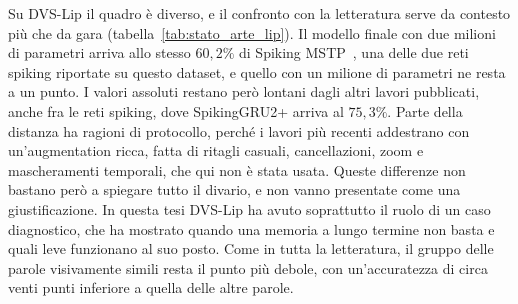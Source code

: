 Su DVS-Lip il quadro è diverso, e il confronto con la letteratura serve da contesto più che da gara (tabella~\ref{tab:stato_arte_lip}). Il modello finale con due milioni di parametri arriva allo stesso $60{,}2\%$ di Spiking MSTP~\cite{zheng2026tvta}, una delle due reti spiking riportate su questo dataset, e quello con un milione di parametri ne resta a un punto. I valori assoluti restano però lontani dagli altri lavori pubblicati, anche fra le reti spiking, dove SpikingGRU2+ arriva al $75{,}3\%$. Parte della distanza ha ragioni di protocollo, perché i lavori più recenti addestrano con un'augmentation ricca, fatta di ritagli casuali, cancellazioni, zoom e mascheramenti temporali, che qui non è stata usata. Queste differenze non bastano però a spiegare tutto il divario, e non vanno presentate come una giustificazione. In questa tesi DVS-Lip ha avuto soprattutto il ruolo di un caso diagnostico, che ha mostrato quando una memoria a lungo termine non basta e quali leve funzionano al suo posto. Come in tutta la letteratura, il gruppo delle parole visivamente simili resta il punto più debole, con un'accuratezza di circa venti punti inferiore a quella delle altre parole.

